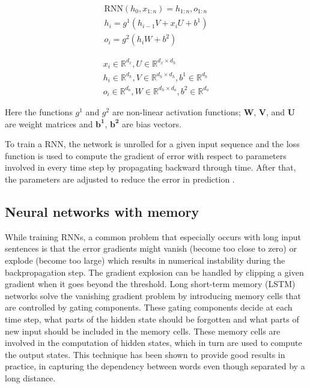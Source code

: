 \documentclass[a4paper, 11pt]{article}
\begin{document}
\begin{align*}
\mathrm{RNN}(h_0,x_{1:n}) = h_{1:n}, o_{1:n} \\
h_i = g^1(h_{i-1}V + x_iU + b^1) \\
o_i = g^2(h_iW + b^2) 
\end{align*}

\begin{align*}
x_i \in \mathbb{R}^{d_x}, U \in \mathbb{R}^{d_x \times d_h} \\
h_i \in \mathbb{R}^{d_h}, V \in \mathbb{R}^{d_h \times d_h}, b^1 \in \mathbb{R}^{d_h} \\
o_i \in \mathbb{R}^{d_o}, W \in \mathbb{R}^{d_h \times d_o}, b^2 \in \mathbb{R}^{d_o}
\end{align*}

Here the functions $g^{1}$ and $g^{2}$ are non-linear activation functions; $\mathbf{W}$, $\mathbf{V}$, and $\mathbf{U}$ are weight matrices and $\mathbf{b^{1}}$, $\mathbf{b^{2}}$ are bias vectors. 

To train a RNN, the network is unrolled for a given input sequence and the loss function is used to compute the gradient of error with respect to parameters involved in every time step by propagating backward through time. After that, the parameters are adjusted to reduce the error in prediction \parencite{Werbos1990}. 

\subsection{Neural networks with memory}

While training RNNs, a common problem that especially occurs with long input sentences is that the error gradients might vanish (become too close to zero) or explode (become too large) which results in numerical instability during the backpropagation step. The gradient explosion can be handled by clipping a given gradient when it goes beyond the threshold. Long short-term memory (LSTM) networks \parencite{Hochreiter1997} solve the vanishing gradient problem by introducing memory cells that are controlled by gating components. These gating components decide at each time step, what parts of the hidden state should be forgotten and what parts of new input should be included in the memory cells. These memory cells are involved in the computation of hidden states, which in turn are used to compute the output states. This technique has been shown to provide good results in practice, in capturing the dependency between words even though separated by a long distance.
\end{document}
